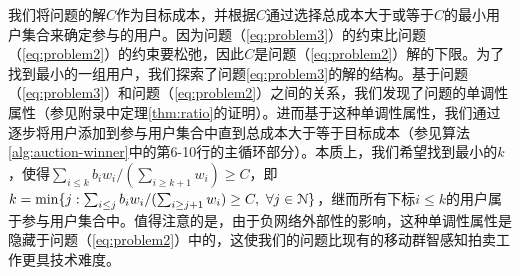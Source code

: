 	我们将问题的解$C$作为目标成本，并根据$C$通过选择总成本大于或等于$C$的最小用户集合来确定参与的用户。因为问题（\ref{eq:problem3}）的约束比问题（\ref{eq:problem2}）的约束要松弛，因此$C$是问题（\ref{eq:problem2}）解的下限。为了找到最小的一组用户，我们探索了问题\ref{eq:problem3}的解的结构。基于问题（\ref{eq:problem3}）和问题（\ref{eq:problem2}）之间的关系，我们发现了问题的{\kaishu 单调性}属性（参见附录中定理\ref{thm:ratio}的证明）。进而基于这种单调性属性，我们通过逐步将用户添加到参与用户集合中直到总成本大于等于目标成本（参见算法\ref{alg:auction-winner}中的第6-10行的主循环部分）。本质上，我们希望找到最小的$k$，使得$\sum_{i\le k}b_iw_i/(\sum_{i\ge k+1}w_i)\ge C$，即$k=\min\{j: \sum_{i\le j}b_iw_i/(\sum_{i\ge j+1}w_i)\ge C,~\forall j\in\mathcal{N}\}$，继而所有下标$i\le k$的用户属于参与用户集合中。值得注意的是，由于负网络外部性的影响，这种单调性属性是隐藏于问题（\ref{eq:problem2}）中的，这使我们的问题比现有的移动群智感知拍卖工作更具技术难度。

